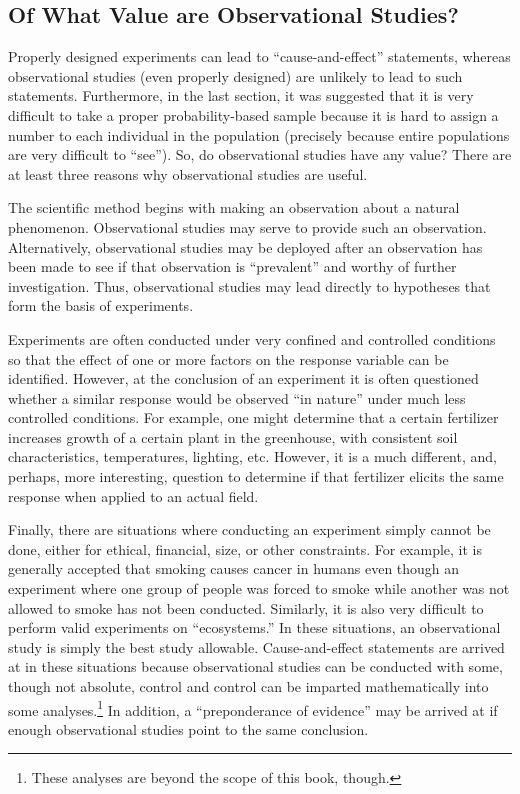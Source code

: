 \documentclass[10pt,openany]{book}\usepackage[]{graphicx}\usepackage[]{color}
\begin{document}
\subsection{Of What Value are Observational Studies?}
Properly designed experiments can lead to ``cause-and-effect'' statements, whereas observational studies (even properly designed) are unlikely to lead to such statements. Furthermore, in the last section, it was suggested that it is very difficult to take a proper probability-based sample because it is hard to assign a number to each individual in the population (precisely because entire populations are very difficult to ``see''). So, do observational studies have any value?  There are at least three reasons why observational studies are useful.

The scientific method begins with making an observation about a natural phenomenon. Observational studies may serve to provide such an observation. Alternatively, observational studies may be deployed after an observation has been made to see if that observation is ``prevalent'' and worthy of further investigation. Thus, observational studies may lead directly to hypotheses that form the basis of experiments.

Experiments are often conducted under very confined and controlled conditions so that the effect of one or more factors on the response variable can be identified. However, at the conclusion of an experiment it is often questioned whether a similar response would be observed ``in nature'' under much less controlled conditions. For example, one might determine that a certain fertilizer increases growth of a certain plant in the greenhouse, with consistent soil characteristics, temperatures, lighting, etc. However, it is a much different, and, perhaps, more interesting, question to determine if that fertilizer elicits the same response when applied to an actual field.

Finally, there are situations where conducting an experiment simply cannot be done, either for ethical, financial, size, or other constraints. For example, it is generally accepted that smoking causes cancer in humans even though an experiment where one group of people was forced to smoke while another was not allowed to smoke has not been conducted. Similarly, it is also very difficult to perform valid experiments on ``ecosystems.''  In these situations, an observational study is simply the best study allowable. Cause-and-effect statements are arrived at in these situations because observational studies can be conducted with some, though not absolute, control and control can be imparted mathematically into some analyses.\footnote{These analyses are beyond the scope of this book, though.} In addition, a ``preponderance of evidence'' may be arrived at if enough observational studies point to the same conclusion.
\end{document}
